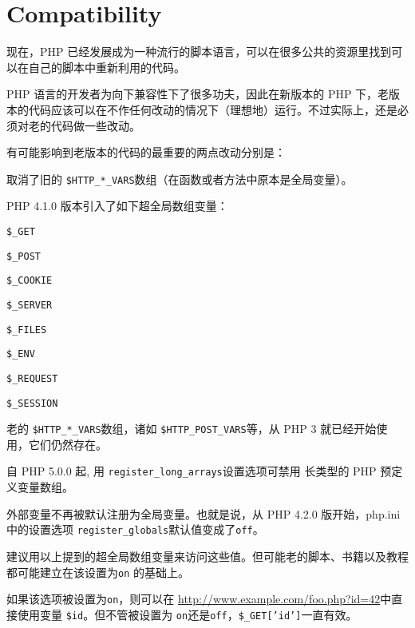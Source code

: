 \chapter{Compatibility}

现在，PHP 已经发展成为一种流行的脚本语言，可以在很多公共的资源里找到可以在自己的脚本中重新利用的代码。

PHP 语言的开发者为向下兼容性下了很多功夫，因此在新版本的 PHP 下，老版本的代码应该可以在不作任何改动的情况下（理想地）运行。不过实际上，还是必须对老的代码做一些改动。

有可能影响到老版本的代码的最重要的两点改动分别是：

\begin{compactitem}
\item 取消了旧的 \texttt{\$HTTP\_*\_VARS}数组（在函数或者方法中原本是全局变量）。

\end{compactitem}

PHP 4.1.0 版本引入了如下超全局数组变量：

\begin{compactitem}
\item \texttt{\$\_GET}
\item \texttt{\$\_POST}
\item \texttt{\$\_COOKIE}
\item \texttt{\$\_SERVER}
\item \texttt{\$\_FILES}
\item \texttt{\$\_ENV}
\item \texttt{\$\_REQUEST}
\item \texttt{\$\_SESSION}
\end{compactitem}

老的 \texttt{\$HTTP\_*\_VARS}数组，诸如 \texttt{\$HTTP\_POST\_VARS}等，从 PHP 3 就已经开始使用，它们仍然存在。


自 PHP 5.0.0 起, 用 \texttt{register\_long\_arrays}设置选项可禁用 长类型的 PHP 预定义变量数组。


\begin{compactitem}
\item 外部变量不再被默认注册为全局变量。也就是说，从 PHP 4.2.0 版开始，php.ini 中的设置选项 \texttt{register\_globals}默认值变成了\texttt{off}。

\end{compactitem}

建议用以上提到的超全局数组变量来访问这些值。但可能老的脚本、书籍以及教程都可能建立在该设置为\texttt{on} 的基础上。

如果该选项被设置为\texttt{on}，则可以在 \url{http://www.example.com/foo.php?id=42}中直接使用变量 \texttt{\$id}。但不管被设置为 \texttt{on}还是\texttt{off}，\texttt{\$\_GET['id']}一直有效。







